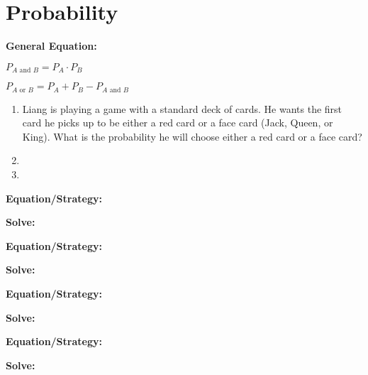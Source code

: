 \section{Probability}

\textbf{General Equation:}


\begin{center}
\renewcommand{\columnseprule}{0pt}
\begin{multicols}{2}
$P_{A\mbox{ and }B}=P_A\cdot P_B$

$P_{A\mbox{ or }B}=P_A+P_B-P_{A\mbox{ and }B}$
\end{multicols}
\end{center}

\begin{enumerate}[labelindent=*,style=multiline,leftmargin=*,label=\textbf{Example \arabic*:}]
\item Liang is playing a game with a standard deck of cards. He wants the first card he picks up to be either a red card or a face card (Jack, Queen, or King). What is the probability he will choose either a red card or a face card?
\vfill\item
\vfill\item
\end{enumerate}

\vfill
\newpage
\begin{multicols*}{2}
\begin{outline}[enumerate]
\medium

\1 

\bigskip
\textbf{Equation/Strategy:} \hrulefill

\bigskip
\textbf{Solve:}

\vfill
\2 
\2 
\2 
\2 
\2 

\midline

\1 

\bigskip
\textbf{Equation/Strategy:} \hrulefill

\bigskip
\textbf{Solve:}

\vfill
\2 
\2 
\2 
\2 
\2 

\columnbreak
\advanced

\1 

\bigskip
\textbf{Equation/Strategy:} \hrulefill

\bigskip
\textbf{Solve:}

\vfill
\2 
\2 
\2 
\2 
\2 

\midline

\1 

\bigskip
\textbf{Equation/Strategy:}

\bigskip
\textbf{Solve:}

\vfill
\2
\2
\2
\2
\2
\end{outline}
\end{multicols*}